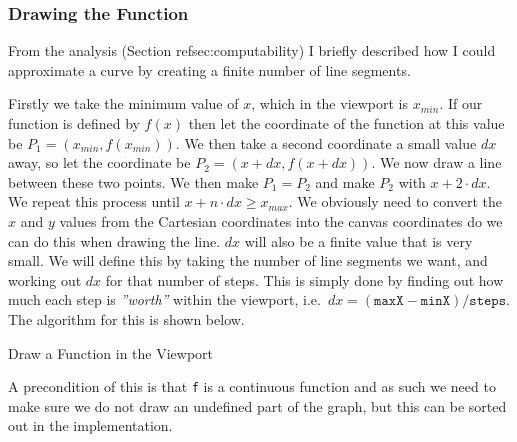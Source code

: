\documentclass[../../../../../../main.tex]{subfiles}
\begin{document}
\subsubsection{Drawing the Function}
From the analysis (Section ref{sec:computability}) I briefly described how I could approximate a curve by creating a finite number of line segments.

Firstly we take the minimum value of $x$, which in the viewport is $x_{min}$. If our function is defined by $f(x)$ then let the coordinate of the function at this value be $P_1 = (x_{min},f(x_{min}))$. We then take a second coordinate a small value $dx$ away, so let the coordinate be $P_2 = (x+dx,f(x+dx))$. We now draw a line between these two points. We then make $P_1 = P_2$ and make $P_2$ with $x+2\cdot dx$. We repeat this process until $x+n\cdot dx \geq x_{max}$. We obviously need to convert the $x$ and $y$ values from the Cartesian coordinates into the canvas coordinates do we can do this when drawing the line. $dx$ will also be a finite value that is very small. We will define this by taking the number of line segments we want, and working out $dx$ for that number of steps. This is simply done by finding out how much each step is \textit{''worth''} within the viewport, i.e.\ $dx = (\texttt{maxX} - \texttt{minX})/\texttt{steps}$. The algorithm for this is shown below.

\begin{algorithm}
\DontPrintSemicolon
\caption{Draw a Function in the Viewport}
\label{alg:drawFunc}
\end{algorithm}

A precondition of this is that \texttt{f} is a continuous function and as such we need to make sure we do not draw an undefined part of the graph, but this can be sorted out in the implementation.
\end{document}

